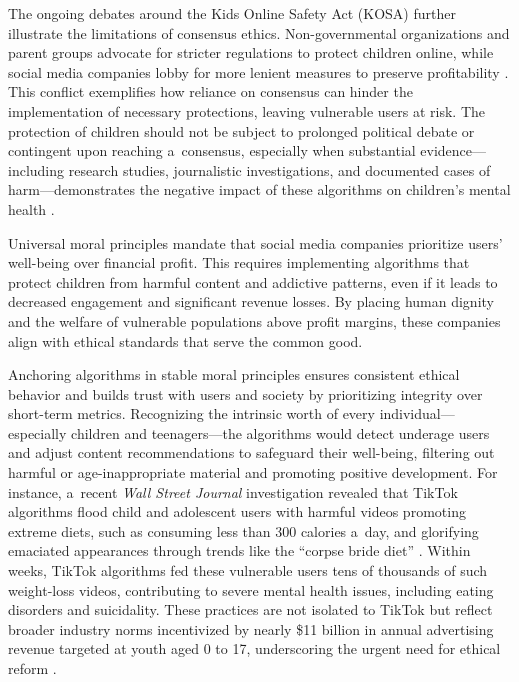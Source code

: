 \documentclass[%
  manuscript=article,
  year=2024,
  volume=77,
  doi=10.59203/zfn.77.707,
]{zfn}
\begin{document}
The ongoing debates around the Kids Online Safety Act (KOSA) further illustrate the limitations of consensus ethics. Non-governmental organizations and parent groups advocate for stricter regulations to protect children online, while social media companies lobby for more lenient measures to preserve profitability 
\parencite[][]{paul_whats_2024}. %
 This conflict exemplifies how reliance on consensus can hinder the implementation of necessary protections, leaving vulnerable users at risk. The protection of children should not be subject to prolonged political debate or contingent upon reaching a~consensus, especially when substantial evidence---including research studies, journalistic investigations, and documented cases of harm---demonstrates the negative impact of these algorithms on children's mental health 
\parencite[][]{panoptykon_foundation_fixing_2023}.%




Universal moral principles mandate that social media companies prioritize users' well-being over financial profit. This requires implementing algorithms that protect children from harmful content and addictive patterns, even if it leads to decreased engagement and significant revenue losses. By placing human dignity and the welfare of vulnerable populations above profit margins, these companies align with ethical standards that serve the common good.



Anchoring algorithms in stable moral principles ensures consistent ethical behavior and builds trust with users and society by prioritizing integrity over short-term metrics. Recognizing the intrinsic worth of every individual---especially children and teenagers---the algorithms would detect underage users and adjust content recommendations to safeguard their well-being, filtering out harmful or age-inappropriate material and promoting positive development. For instance, a~recent \textit{Wall Street Journal} investigation revealed that TikTok algorithms flood child and adolescent users with harmful videos promoting extreme diets, such as consuming less than 300 calories a~day, and glorifying emaciated appearances through trends like the ``corpse bride diet'' 
\parencite[][]{hobbs_corpse_2021}. %
 Within weeks, TikTok algorithms fed these vulnerable users tens of thousands of such weight-loss videos, contributing to severe mental health issues, including eating disorders and suicidality. These practices are not isolated to TikTok but reflect broader industry norms incentivized by nearly \$11 billion in annual advertising revenue targeted at youth aged 0 to 17, underscoring the urgent need for ethical reform 
\parencite[][]{costello_algorithms_2023}.%
\end{document}
